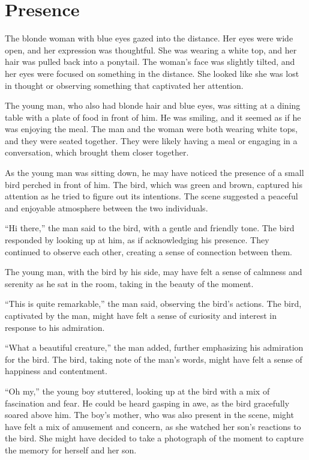 \documentclass[smalldemyvopaper,11pt,twoside,onecolumn,openright,extrafontsizes]{memoir}
\begin{document}
\chapter{Presence}
The blonde woman with blue eyes gazed into the distance. Her eyes were wide open, and her expression was thoughtful. She was wearing a white top, and her hair was pulled back into a ponytail. The woman's face was slightly tilted, and her eyes were focused on something in the distance. She looked like she was lost in thought or observing something that captivated her attention.\par
The young man, who also had blonde hair and blue eyes, was sitting at a dining table with a plate of food in front of him. He was smiling, and it seemed as if he was enjoying the meal. The man and the woman were both wearing white tops, and they were seated together. They were likely having a meal or engaging in a conversation, which brought them closer together.\par
As the young man was sitting down, he may have noticed the presence of a small bird perched in front of him. The bird, which was green and brown, captured his attention as he tried to figure out its intentions. The scene suggested a peaceful and enjoyable atmosphere between the two individuals.\par
“Hi there,” the man said to the bird, with a gentle and friendly tone. The bird responded by looking up at him, as if acknowledging his presence. They continued to observe each other, creating a sense of connection between them.\par
The young man, with the bird by his side, may have felt a sense of calmness and serenity as he sat in the room, taking in the beauty of the moment.\par
“This is quite remarkable,” the man said, observing the bird’s actions. The bird, captivated by the man, might have felt a sense of curiosity and interest in response to his admiration.\par
“What a beautiful creature,” the man added, further emphasizing his admiration for the bird. The bird, taking note of the man’s words, might have felt a sense of happiness and contentment.\par
“Oh my,” the young boy stuttered, looking up at the bird with a mix of fascination and fear. He could be heard gasping in awe, as the bird gracefully soared above him. The boy's mother, who was also present in the scene, might have felt a mix of amusement and concern, as she watched her son's reactions to the bird. She might have decided to take a photograph of the moment to capture the memory for herself and her son.\par
\end{document}
